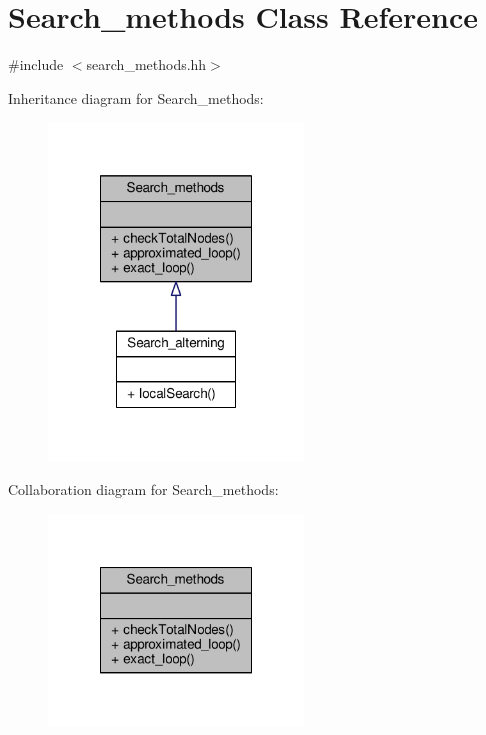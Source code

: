 \hypertarget{classSearch__methods}{\section{Search\-\_\-methods Class Reference}
\label{classSearch__methods}
}


{\ttfamily \#include $<$search\-\_\-methods.\-hh$>$}



Inheritance diagram for Search\-\_\-methods\-:\nopagebreak
\begin{figure}[H]
\begin{center}
\leavevmode
\includegraphics[width=192pt]{classSearch__methods__inherit__graph}
\end{center}
\end{figure}


Collaboration diagram for Search\-\_\-methods\-:\nopagebreak
\begin{figure}[H]
\begin{center}
\leavevmode
\includegraphics[width=192pt]{classSearch__methods__coll__graph}
\end{center}
\end{figure}
